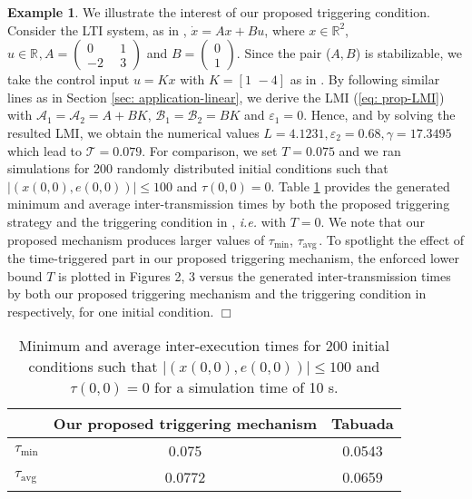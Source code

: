 \documentclass[a4paper, 9pt, twocolumn]{IEEEtran}
\theoremstyle{plain}
\theoremstyle{definition}
\newtheorem{exmple}{Example}
\newcommand{\avg}{\ensuremath{\text{avg}\,}}
\newcommand{\R}[2]{\ensuremath{\mathbb{R}^{#1}_{#2}}}
\begin{document}
\begin{exmple}
We illustrate the interest of our proposed triggering condition. Consider the LTI system, as in \cite{Tabuada2007event}, $\dot{x} = Ax + Bu$, where $x \in \R{2}{}$, $u\in \R{}{}, A = \left(\begin{smallmatrix}0 &\hspace{6pt} 1\\[6pt] -2 &\hspace{6pt} 3\end{smallmatrix}\right)$ and $B = \left(\begin{smallmatrix}0 \\[6pt] 1\end{smallmatrix}\right)$. Since the pair ($A,B$) is stabilizable, we take the control input $u=Kx$ with $K = [1 \,\,-4]$ as in \cite{Tabuada2007event}. By following similar lines as in Section \ref{sec: application-linear}, we derive the LMI (\ref{eq: prop-LMI}) with $\mathcal{A}_{1}=\mathcal{A}_{2}=A+BK$, $\mathcal{B}_{1}=\mathcal{B}_{2}=BK$ and $\varepsilon_{1}=0$. Hence, and by solving the resulted LMI, we obtain the numerical values $L = 4.1231, \varepsilon_{2} = 0.68, \gamma = 17.3495$ which lead to $\mathcal{T} = 0.079$. For comparison, we set $T = 0.075$ and we ran simulations for 200 randomly distributed initial conditions such that $|(x(0,0),e(0,0))|\leq 100$ and $\tau(0,0)=0$. Table \ref{tbl:tau-min-avg} provides the generated minimum and average inter-transmission times by both the proposed triggering strategy and the triggering condition in \cite{Tabuada2007event}, \textit{i.e.} with $T = 0$. We note that our proposed mechanism produces larger values of $\tau_{\min}$, $\tau_{\avg}$. To spotlight the effect of the time-triggered part in our proposed triggering mechanism, the enforced lower bound $T$ is plotted in Figures 2, 3 versus the generated inter-transmission times by both our proposed triggering mechanism and the triggering condition in \cite{Tabuada2007event} respectively, for one initial condition. \hfill $\Box$

\begin{table}[H]
\begin{center}
  \begin{tabular}{ l | c | c }
                & Our proposed triggering mechanism & Tabuada \cite{Tabuada2007event}  \\ \hline
  $\tau_{\min}$ & 0.075                                   & 0.0543 \\ \hline
  $\tau_{\avg}$ & 0.0772                                  & 0.0659
  \end{tabular}
  \caption{Minimum and average inter-execution times for 200 initial conditions such that $|(x(0,0),e(0,0))|\leq 100$ and $\tau(0,0)=0$ for a simulation time of 10 s.}
  \label{tbl:tau-min-avg}
\end{center}
\end{table}


\end{exmple}
\end{document}
